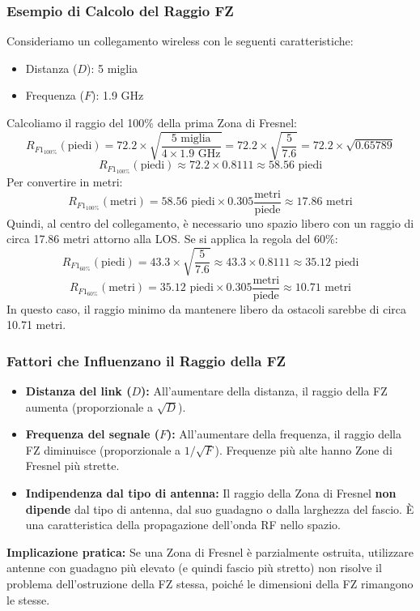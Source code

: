 \subsubsection{Esempio di Calcolo del Raggio FZ}
Consideriamo un collegamento wireless con le seguenti caratteristiche:
\begin{itemize}
    \item Distanza ($D$): 5 miglia
    \item Frequenza ($F$): 1.9 GHz
\end{itemize}
Calcoliamo il raggio del 100\% della prima Zona di Fresnel:
\[ R_{F1_{\text{100\%}}} (\text{piedi}) = 72.2 \times \sqrt{\frac{5 \text{ miglia}}{4 \times 1.9 \text{ GHz}}} = 72.2 \times \sqrt{\frac{5}{7.6}} = 72.2 \times \sqrt{0.65789} \]
\[ R_{F1_{\text{100\%}}} (\text{piedi}) \approx 72.2 \times 0.8111 \approx 58.56 \text{ piedi} \]
Per convertire in metri:
\[ R_{F1_{\text{100\%}}} (\text{metri}) = 58.56 \text{ piedi} \times 0.305 \frac{\text{metri}}{\text{piede}} \approx 17.86 \text{ metri} \]
Quindi, al centro del collegamento, è necessario uno spazio libero con un raggio di circa 17.86 metri attorno alla LOS. Se si applica la regola del 60\%:
\[ R_{F1_{\text{60\%}}} (\text{piedi}) = 43.3 \times \sqrt{\frac{5}{7.6}} \approx 43.3 \times 0.8111 \approx 35.12 \text{ piedi} \]
\[ R_{F1_{\text{60\%}}} (\text{metri}) = 35.12 \text{ piedi} \times 0.305 \frac{\text{metri}}{\text{piede}} \approx 10.71 \text{ metri} \]
In questo caso, il raggio minimo da mantenere libero da ostacoli sarebbe di circa 10.71 metri.

\subsubsection{Fattori che Influenzano il Raggio della FZ}
\begin{itemize}
    \item \textbf{Distanza del link ($D$):} All'aumentare della distanza, il raggio della FZ aumenta (proporzionale a $\sqrt{D}$).
    \item \textbf{Frequenza del segnale ($F$):} All'aumentare della frequenza, il raggio della FZ diminuisce (proporzionale a $1/\sqrt{F}$). Frequenze più alte hanno Zone di Fresnel più strette.
    \item \textbf{Indipendenza dal tipo di antenna:} Il raggio della Zona di Fresnel \textbf{non dipende} dal tipo di antenna, dal suo guadagno o dalla larghezza del fascio. È una caratteristica della propagazione dell'onda RF nello spazio.
\end{itemize}
\textbf{Implicazione pratica:} Se una Zona di Fresnel è parzialmente ostruita, utilizzare antenne con guadagno più elevato (e quindi fascio più stretto) non risolve il problema dell'ostruzione della FZ stessa, poiché le dimensioni della FZ rimangono le stesse.

